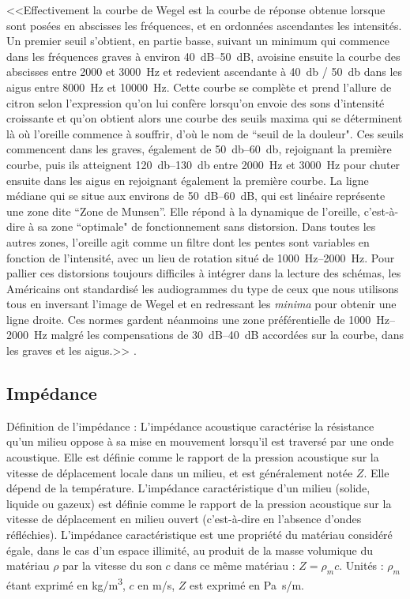 <<Effectivement la courbe de Wegel est la courbe de réponse obtenue
lorsque sont posées en abscisses les fréquences, et en ordonnées ascendantes
les intensités. Un premier seuil s'obtient, en partie basse, suivant
un minimum qui commence dans les fréquences graves à environ 
\SIrange{40}{50}{\dB}, avoisine ensuite la courbe des abscisses entre 2000 et \SI{3000}{\Hz}
et redevient ascendante à \SI{40}{\decibel} / \SI{50}{\decibel} dans les aigus entre \SI{8000}{\Hz} et
\SI{10000}{\Hz}. Cette courbe se complète et prend l'allure de citron selon
l'expression qu'on lui confère lorsqu'on envoie des
sons d'intensité croissante et qu'on obtient alors une courbe des
seuils maxima qui se déterminent là où l'oreille commence à souffrir,
d'où le nom de ``seuil de la douleur". Ces seuils
commencent dans les graves, également de \SIrange{50}{60}{\decibel}, rejoignant la première
courbe, puis ils atteignent \SIrange{120}{130}{\decibel} entre \SI{2000}{\Hz} et \SI{3000}{\Hz} pour
chuter ensuite dans les aigus en rejoignant également la première
courbe. La ligne médiane qui se situe aux environs de \SIrange{50}{60}{\dB}, qui
est linéaire représente une zone dite ``Zone de Munsen''.
Elle répond à la dynamique de l'oreille, c'est-à-dire
à sa zone ``optimale" de fonctionnement sans
distorsion. Dans toutes les autres zones, l'oreille
agit comme un filtre dont les pentes sont variables en fonction de
l'intensité, avec un lieu de rotation situé de \SIrange{1000}{2000}{\Hz}. Pour pallier ces distorsions toujours difficiles à intégrer
dans la lecture des schémas, les Américains ont standardisé les audiogrammes
du type de ceux que nous utilisons tous en inversant l'image
de Wegel et en redressant les \emph{minima} pour obtenir une ligne droite.
Ces normes gardent néanmoins une zone préférentielle de \SIrange{1000}{2000}{\Hz} malgré les compensations de \SIrange{30}{40}{\dB} accordées sur la courbe,
dans les graves et les aigus.>>
\autocite[Bernard Auriol, conversation, conférence]{auriol_stress}.


\subsection{Impédance}
\label{impedance}
Définition de l'impédance : L'impédance acoustique
caractérise la résistance qu'un milieu oppose à sa mise en mouvement
lorsqu'il est traversé par une onde acoustique. Elle est définie comme
le rapport de la pression acoustique sur la vitesse de déplacement
locale dans un milieu, et est généralement notée $Z$. Elle dépend de
la température. L'impédance caractéristique d'un milieu (solide, liquide
ou gazeux) est définie comme le rapport de la pression acoustique
sur la vitesse de déplacement en milieu ouvert (c'est-à-dire
en l'absence d'ondes réfléchies). L'impédance caractéristique est
une propriété du matériau considéré égale, dans le cas d'un espace
illimité, au produit de la masse volumique du matériau $\rho$
par la vitesse du son $c$ dans ce même matériau : $Z = \rho_{m} c$.
Unités : $\rho_{m}$ étant exprimé en \si{kg/m\cubed},
$c$ en \si{m/s}, $Z$ est
exprimé en \si{\pascal . s/m}.

